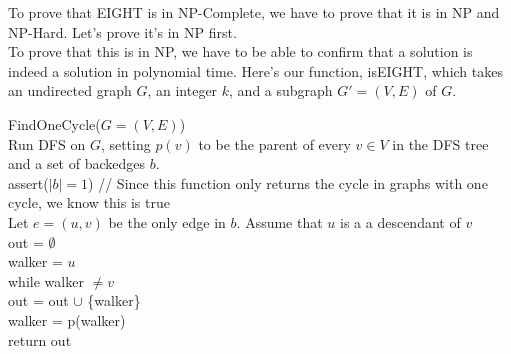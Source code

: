 \documentclass[11pt]{article}
\begin{document}
\begin{solution}
    To prove that EIGHT is in NP-Complete, we have to prove that it is in NP and NP-Hard. Let's prove it's in NP first. 
    \\ To prove that this is in NP, we have to be able to confirm that a solution is indeed a solution in polynomial time. Here's our function, isEIGHT, which takes an undirected graph $G$, an integer $k$, and a subgraph $G' = (V, E)$ of $G$.
    \begin{algo}
        FindOneCycle($G = (V, E)$) \+
        \\ Run DFS on $G$, setting $p(v)$ to be the parent of every $v \in V$ in the DFS tree
        \\ and a set of backedges $b$.
        \\ assert($|b| = 1$) // Since this function only returns the cycle in graphs with one cycle, we know this is true
        \\ Let $e = (u, v)$ be the only edge in $b$. Assume that $u$ is a a descendant of $v$
        \\ out = $\emptyset$
        \\ walker = $u$
        \\ while walker $\not = v$ \+
        \\ out = out $\cup$ \{walker\}
        \\ walker = p(walker) \-
        \\ return out


\end{algo}
\end{solution}
\end{document}
